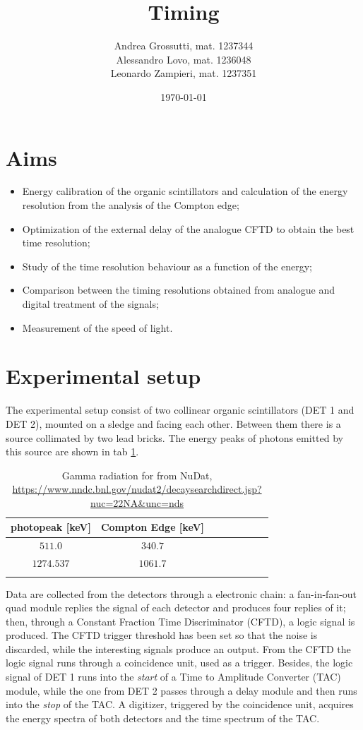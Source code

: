 \documentclass[11pt,a4 paper]{article}
\title{Timing}
\author{Andrea Grossutti, mat. 1237344\\Alessandro Lovo, mat. 1236048\\Leonardo Zampieri, mat. 1237351}
\date{\today}
\begin{document}
\maketitle

\section{Aims}
\begin{itemize}[noitemsep]
    \item Energy calibration of the organic scintillators and calculation of the energy resolution from the analysis of the Compton edge;
    \item Optimization of the external delay of the analogue CFTD to obtain the best time resolution;
    \item Study of the time resolution behaviour as a function of the energy;
    \item Comparison between the timing resolutions obtained from analogue and digital treatment of the signals;
    \item Measurement of the speed of light.
\end{itemize}

\section{Experimental setup}
The experimental setup consist of two collinear organic scintillators (DET 1 and DET 2), mounted on a sledge and facing each other. Between them there is a  source collimated by two lead bricks. The energy peaks of photons emitted by this source are shown in tab \ref{tab:gammavalue}.

\begin{table}[H]
    \centering
    \begin{tabular}{cccccccc}
        \toprule
        photopeak [keV] & Compton Edge [keV] \\
        \midrule
        $511.0$ & $340.7$\\
        $1274.537$ & $1061.7$ \\
        \bottomrule\vspace{0.01cm}
    \end{tabular}
    \caption{Gamma radiation for  from NuDat, \url{https://www.nndc.bnl.gov/nudat2/decaysearchdirect.jsp?nuc=22NA\&unc=nds}}
    \label{tab:gammavalue}
\end{table}

Data are collected from the detectors through a electronic chain: a fan-in-fan-out quad module replies the signal of each detector and produces four replies of it; then, through a Constant Fraction Time Discriminator (CFTD), a logic signal is produced. The CFTD trigger threshold has been set so that the noise is discarded, while the interesting signals produce an output. From the CFTD the logic signal runs through a coincidence unit, used as a trigger. Besides, the logic signal of DET 1 runs into the \emph{start} of a Time to Amplitude Converter (TAC) module, while the one from DET 2 passes through a delay module and then runs into the \emph{stop} of the TAC. A digitizer, triggered by the coincidence unit, acquires the energy spectra of both detectors and the time spectrum of the TAC.
\end{document}
